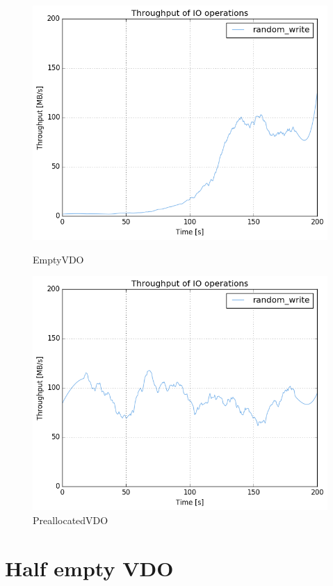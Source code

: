 \documentclass[
  color, %
  table, %
  lof,   %
  lot,   %
]{fithesis3}
\begin{document}
\begin{figure}[!h]
        \centering
        \includegraphics[width=\textwidth]{../results/empty_VDO/HDD/tar_467_bw}
\caption[EmptyVDO]{EmptyVDO}
\label{fig:emptyVDO}
        \centering
        \includegraphics[width=\textwidth]{../results/empty_VDO/HDD/tar_224_bw}
\caption[preallVDO]{PreallocatedVDO}
\label{fig:preallocatedVDO}
\end{figure}

\clearpage
\section{Half empty VDO}
\end{document}
